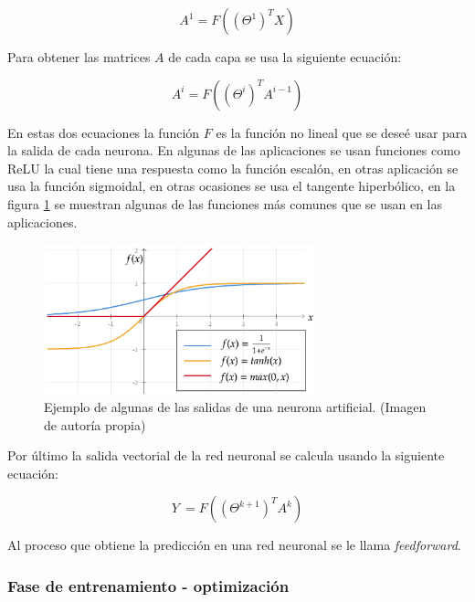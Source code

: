 \begin{equation}
	A^{1} =F\left(\left( \Theta ^{1}\right)^{T} X\right) 
\end{equation}
		    
\par Para obtener las matrices $A$ de cada capa se usa la siguiente ecuación:
		    
\begin{equation}
	A^{i} =F\left(\left( \Theta ^{i}\right)^{T} A^{i-1}\right)
\end{equation}
			
\par En estas dos ecuaciones la función $F$ es la función no lineal que se deseé usar para la salida de cada neurona. En algunas de las aplicaciones se usan funciones como \gls{ReLU} la cual tiene una respuesta como la función escalón, en otras aplicación se usa la función sigmoidal, en otras ocasiones se usa el tangente hiperbólico, en la figura \ref{fig:funciones} se muestran algunas de las funciones más comunes que se usan en las aplicaciones.
\begin{figure}
	\centering
	\includegraphics[width=0.7\textwidth]{imagenes/graficaF.png}
	\caption{Ejemplo de algunas de las salidas de una neurona artificial. (Imagen de autoría propia)}
	\label{fig:funciones}
\end{figure}
\par Por último la salida vectorial de la red neuronal se calcula usando la siguiente ecuación:
			
\begin{equation}
	Y\ =F\left(\left( \Theta ^{k+1}\right)^{T} A^{k}\right)
\end{equation}
			
\par Al proceso que obtiene la predicción en una red neuronal se le llama \textit{feedforward}.
			
\subsubsection{Fase de entrenamiento - optimización}
			
